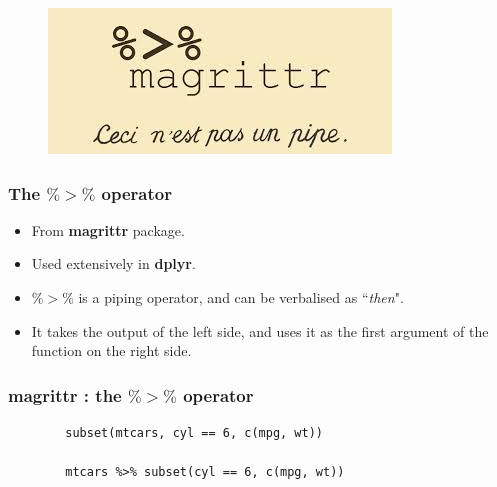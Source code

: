 \documentclass{beamer}
\begin{document}
	\begin{frame}
		\begin{figure}
\centering
\includegraphics[width=0.99\linewidth]{images/pipe2}

\end{figure}

	\end{frame}
	\begin{frame}[fragile]
		\frametitle{ The $\%>\%$ operator}
		\LARGE
		\begin{itemize}
		\item From \textbf{magrittr} package. 
		\item Used extensively in \textbf{dplyr}.
		\item $\%>\%$ is a piping operator, and can be verbalised as ``\textit{then}".
		\item It takes the output of the left side, and uses it as the first
		argument of the function on the right side.
		\end{itemize}
		\end{frame}
		\begin{frame}[fragile]
			\frametitle{magrittr :  the $\%>\%$ operator}
			\Large
		\begin{framed}
		\begin{verbatim}
		subset(mtcars, cyl == 6, c(mpg, wt))
		
		mtcars %>% subset(cyl == 6, c(mpg, wt))
		\end{verbatim}
	\end{framed}
	
\end{frame}
			
\end{document}

